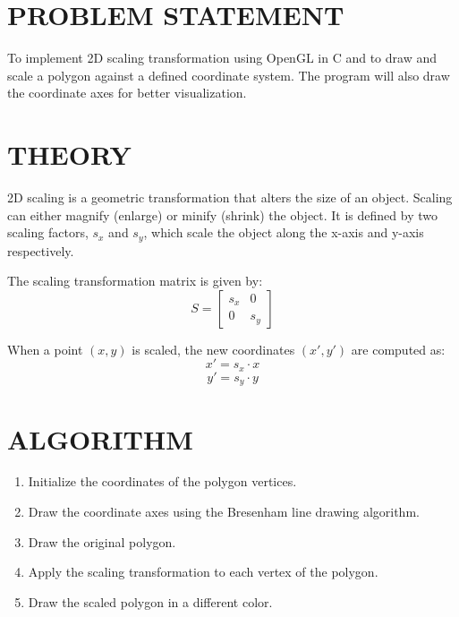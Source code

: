 \documentclass{article}
\begin{document}
\section*{PROBLEM STATEMENT}
To implement 2D scaling transformation using OpenGL in C and to draw and scale a polygon against a defined coordinate system. The program will also draw the coordinate axes for better visualization.

\section*{THEORY}
2D scaling is a geometric transformation that alters the size of an object. Scaling can either magnify (enlarge) or minify (shrink) the object. It is defined by two scaling factors, \(s_x\) and \(s_y\), which scale the object along the x-axis and y-axis respectively.

The scaling transformation matrix is given by:
\[
S = \begin{bmatrix}
s_x & 0 \\
0 & s_y
\end{bmatrix}
\]

When a point \((x, y)\) is scaled, the new coordinates \((x', y')\) are computed as:
\[
x' = s_x \cdot x
\]
\[
y' = s_y \cdot y
\]

\section*{ALGORITHM}

\begin{enumerate}
    \item Initialize the coordinates of the polygon vertices.
    \item Draw the coordinate axes using the Bresenham line drawing algorithm.
    \item Draw the original polygon.
    \item Apply the scaling transformation to each vertex of the polygon.
    \item Draw the scaled polygon in a different color.
\end{enumerate}
\end{document}
